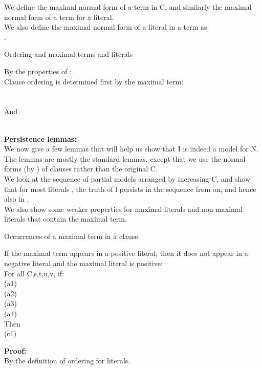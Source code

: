 \begin{definition}{\m{\textcolor{blue}{max'_t,max'_l}}}
\label{def_4.3.1.6}

\noindent
We define  the maximal normal form of a term in C, 
and similarly the maximal normal form of a term for a literal.\\
We also define the maximal normal form of a literal in a term as \\
.
\end{definition}

\begin{lemma}{Ordering and maximal terms and literals}
\label{lemma_4.3.1.5}

\noindent
By the properties of \m{\succ}:\\
Clause ordering is determined first by the maximal term:\\
\\
\\
And\\
\\
\end{lemma}


\textbf{Persistence lemmas:}\\
We now give a few lemmas that will help us show that I is indeed a model for N.
The lemmas are mostly the standard lemmas, except that we use the normal forms (by ) of clauses rather than the original C.\\
We look at the sequence of partial models  arranged by increasing C, 
and show that for most literals , the truth of l persists in the sequence from  on, and hence also in .\\
We also show some weaker properties for maximal literals and non-maximal literals that contain the maximal term.


\noindent
\begin{lemma}{Occurrences of a maximal term in a clause}
\label{lemma_4.3.1.6}

\noindent
If the maximal term appears in a positive literal, then it does not appear in a negative literal and
the maximal literal is positive:\\
For all C,s,t,u,v, if:\\
(a1) \\
(a2) \\
(a3) \\
(a4) \\
Then\\
(c1) 

\noindent
\textbf{Proof:}\\
By the definition of ordering for literals.
\end{lemma}

